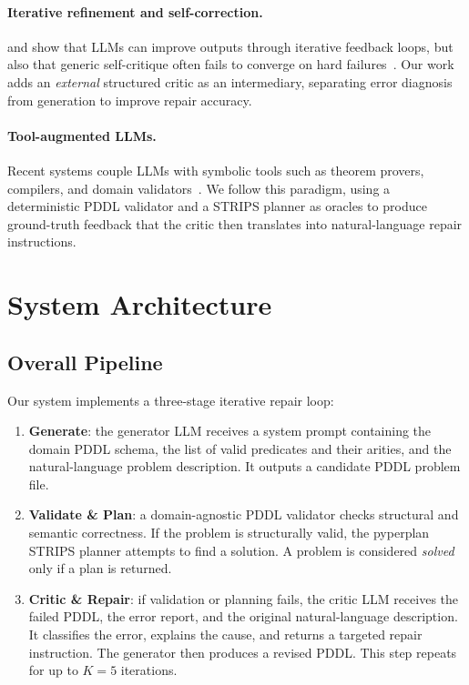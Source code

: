 \documentclass{article}
\begin{document}
\paragraph{Iterative refinement and self-correction.}
\citet{shinn2023reflexion} and \citet{madaan2023selfrefine} show that LLMs can
improve outputs through iterative feedback loops, but also that generic self-critique
often fails to converge on hard failures~\cite{huang2023large}.  Our work adds an
\emph{external} structured critic as an intermediary, separating error diagnosis from
generation to improve repair accuracy.

\paragraph{Tool-augmented LLMs.}
Recent systems couple LLMs with symbolic tools such as theorem provers, compilers,
and domain validators~\cite{chen2022codet,olausson2023self}.  We follow this paradigm,
using a deterministic PDDL validator and a STRIPS planner as oracles to produce
ground-truth feedback that the critic then translates into natural-language repair
instructions.

\section{System Architecture}
\label{sec:system}

\subsection{Overall Pipeline}
\label{sec:pipeline}

Our system implements a three-stage iterative repair loop:

\begin{enumerate}[leftmargin=1.5em]
  \item \textbf{Generate}: the generator LLM receives a system prompt containing the
        domain PDDL schema, the list of valid predicates and their arities, and the
        natural-language problem description.  It outputs a candidate PDDL problem file.
  \item \textbf{Validate \& Plan}: a domain-agnostic PDDL validator checks structural
        and semantic correctness.  If the problem is structurally valid, the pyperplan
        STRIPS planner attempts to find a solution.  A problem is considered
        \emph{solved} only if a plan is returned.
  \item \textbf{Critic \& Repair}: if validation or planning fails, the critic LLM
        receives the failed PDDL, the error report, and the original natural-language
        description.  It classifies the error, explains the cause, and returns a
        targeted repair instruction.  The generator then produces a revised PDDL.
        This step repeats for up to $K=5$ iterations.
\end{enumerate}
\end{document}
